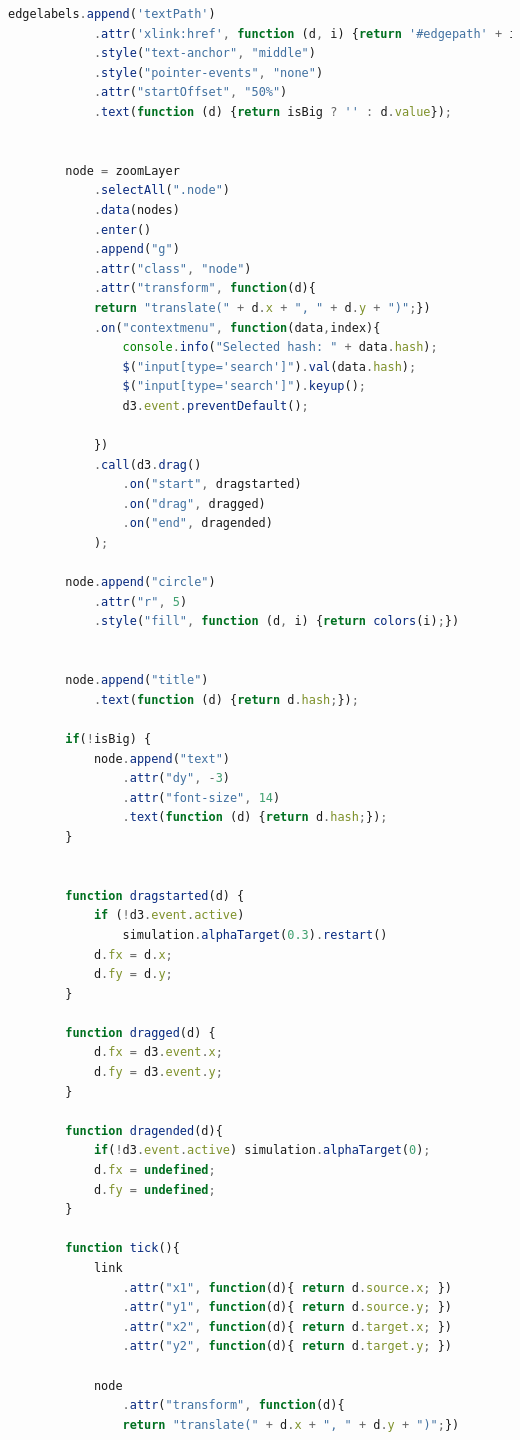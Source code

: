 \begin{itemize}
\begin{lstlisting}[language=Javascript, label=lst:makeGraph, caption={Funzione per grafi.}]
        edgelabels.append('textPath')
            .attr('xlink:href', function (d, i) {return '#edgepath' + i})
            .style("text-anchor", "middle")
            .style("pointer-events", "none")
            .attr("startOffset", "50%")
            .text(function (d) {return isBig ? '' : d.value});


        node = zoomLayer
            .selectAll(".node")
            .data(nodes)
            .enter()
            .append("g")
            .attr("class", "node")
            .attr("transform", function(d){ 
            return "translate(" + d.x + ", " + d.y + ")";})
            .on("contextmenu", function(data,index){
                console.info("Selected hash: " + data.hash);
                $("input[type='search']").val(data.hash);
                $("input[type='search']").keyup();
                d3.event.preventDefault();

            })
            .call(d3.drag()
                .on("start", dragstarted)
                .on("drag", dragged)
                .on("end", dragended)
            );

        node.append("circle")
            .attr("r", 5)
            .style("fill", function (d, i) {return colors(i);})


        node.append("title")
            .text(function (d) {return d.hash;});

        if(!isBig) {
            node.append("text")
                .attr("dy", -3)
                .attr("font-size", 14)
                .text(function (d) {return d.hash;});
        }


        function dragstarted(d) {
            if (!d3.event.active) 
            	simulation.alphaTarget(0.3).restart()
            d.fx = d.x;
            d.fy = d.y;
        }

        function dragged(d) {
            d.fx = d3.event.x;
            d.fy = d3.event.y;
        }

        function dragended(d){
            if(!d3.event.active) simulation.alphaTarget(0);
            d.fx = undefined;
            d.fy = undefined;
        }

        function tick(){
            link
                .attr("x1", function(d){ return d.source.x; })
                .attr("y1", function(d){ return d.source.y; })
                .attr("x2", function(d){ return d.target.x; })
                .attr("y2", function(d){ return d.target.y; })

            node
                .attr("transform", function(d){ 
                return "translate(" + d.x + ", " + d.y + ")";})


\end{lstlisting}
\end{itemize}
